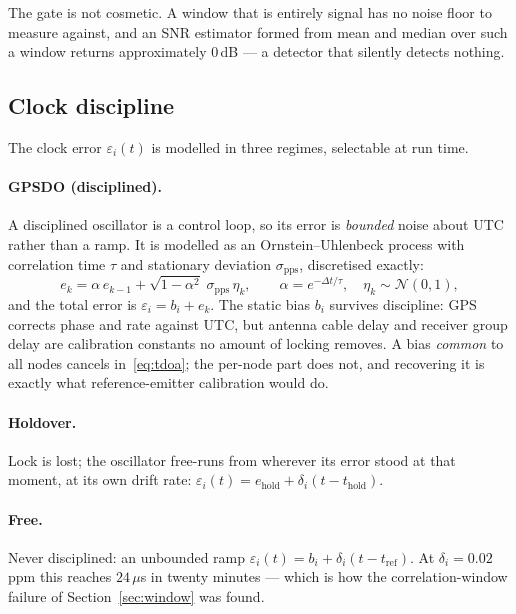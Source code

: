 \documentclass[11pt,a4paper]{article}
\begin{document}
The gate is not cosmetic. A window that is entirely signal has no noise
floor to measure against, and an SNR estimator formed from mean and median
over such a window returns approximately $0$\,dB --- a detector that
silently detects nothing.

\subsection{Clock discipline}

The clock error $\varepsilon_i(t)$ is modelled in three regimes, selectable
at run time.

\paragraph{GPSDO (disciplined).} A disciplined oscillator is a control loop,
so its error is \emph{bounded} noise about UTC rather than a ramp. It is
modelled as an Ornstein--Uhlenbeck process with correlation time $\tau$ and
stationary deviation $\sigma_{\text{pps}}$, discretised exactly:
\begin{equation}
  e_{k} = \alpha\, e_{k-1} + \sqrt{1-\alpha^{2}}\;\sigma_{\text{pps}}\,\eta_k,
  \qquad \alpha=e^{-\Delta t/\tau},\quad \eta_k\sim\mathcal{N}(0,1),
\end{equation}
and the total error is $\varepsilon_i = b_i + e_k$. The static bias $b_i$
survives discipline: GPS corrects phase and rate against UTC, but antenna
cable delay and receiver group delay are calibration constants no amount of
locking removes. A bias \emph{common} to all nodes cancels
in~\eqref{eq:tdoa}; the per-node part does not, and recovering it is exactly
what reference-emitter calibration would do.

\paragraph{Holdover.} Lock is lost; the oscillator free-runs from wherever
its error stood at that moment, at its own drift rate:
$\varepsilon_i(t)=e_{\text{hold}} + \delta_i(t-t_{\text{hold}})$.

\paragraph{Free.} Never disciplined: an unbounded ramp
$\varepsilon_i(t)=b_i+\delta_i (t-t_{\text{ref}})$. At
$\delta_i=0.02$\,ppm this reaches $24\,\mu$s in twenty minutes --- which is
how the correlation-window failure of Section~\ref{sec:window} was found.
\end{document}
